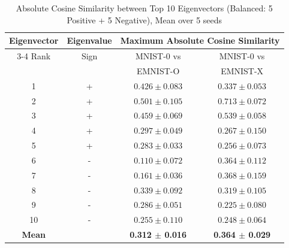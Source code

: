 \begin{table}[htbp]
\centering
\caption{Absolute Cosine Similarity between Top 10 Eigenvectors (Balanced: 5 Positive + 5 Negative), Mean over 5 seeds}
\label{tab:eigenvector_comparison_0_O_X}
\begin{tabular}{cc|cc}
\toprule
Eigenvector & Eigenvalue & \multicolumn{2}{c}{Maximum Absolute Cosine Similarity} \\
\cmidrule(lr){3-4}
Rank & Sign & MNIST-0 vs & MNIST-0 vs \\
 & & EMNIST-O & EMNIST-X \\
\midrule
1 & + & $0.426 \pm 0.083$ & $0.337 \pm 0.053$ \\
2 & + & $0.501 \pm 0.105$ & $0.713 \pm 0.072$ \\
3 & + & $0.459 \pm 0.069$ & $0.539 \pm 0.058$ \\
4 & + & $0.297 \pm 0.049$ & $0.267 \pm 0.150$ \\
5 & + & $0.283 \pm 0.033$ & $0.256 \pm 0.073$ \\
6 & - & $0.110 \pm 0.072$ & $0.364 \pm 0.112$ \\
7 & - & $0.161 \pm 0.036$ & $0.368 \pm 0.159$ \\
8 & - & $0.339 \pm 0.092$ & $0.319 \pm 0.105$ \\
9 & - & $0.286 \pm 0.051$ & $0.225 \pm 0.080$ \\
10 & - & $0.255 \pm 0.110$ & $0.248 \pm 0.064$ \\
\midrule
\textbf{Mean} & & \textbf{0.312 $\pm$ 0.016} & \textbf{0.364 $\pm$ 0.029} \\
\bottomrule
\end{tabular}
\end{table}